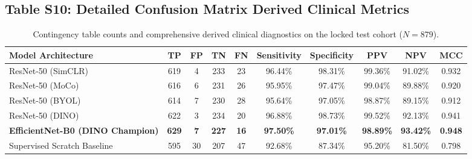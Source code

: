 \documentclass[11pt,a4paper]{article}
\begin{document}
\subsection*{Table S10: Detailed Confusion Matrix Derived Clinical Metrics}
\begin{table}[htbp]
\centering
\caption{Contingency table counts and comprehensive derived clinical diagnostics on the locked test cohort ($N=879$).}
\label{tab:s10_cm}
\begin{adjustbox}{max width=\textwidth}
\begin{tabular}{l c c c c c c c c c}
\toprule
\textbf{Model Architecture} & \textbf{TP} & \textbf{FP} & \textbf{TN} & \textbf{FN} & \textbf{Sensitivity} & \textbf{Specificity} & \textbf{PPV} & \textbf{NPV} & \textbf{MCC} \\
\midrule
ResNet-50 (SimCLR)          & 619 & 4 & 233 & 23 & 96.44\% & 98.31\% & 99.36\% & 91.02\% & 0.932 \\
ResNet-50 (MoCo)            & 616 & 6 & 231 & 26 & 95.95\% & 97.47\% & 99.04\% & 89.88\% & 0.920 \\
ResNet-50 (BYOL)            & 614 & 7 & 230 & 28 & 95.64\% & 97.05\% & 98.87\% & 89.15\% & 0.912 \\
ResNet-50 (DINO)            & 622 & 3 & 234 & 20 & 96.88\% & 98.73\% & 99.52\% & 92.13\% & 0.941 \\
\textbf{EfficientNet-B0 (DINO Champion)} & \textbf{629} & \textbf{7} & \textbf{227} & \textbf{16} & \textbf{97.50\%} & \textbf{97.01\%} & \textbf{98.89\%} & \textbf{93.42\%} & \textbf{0.948} \\
Supervised Scratch Baseline & 595 & 30 & 207 & 47 & 92.68\% & 87.34\% & 95.20\% & 81.50\% & 0.798 \\
\bottomrule
\end{tabular}
\end{adjustbox}
\end{table}
\end{document}
